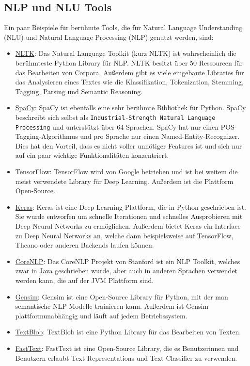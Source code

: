 \subsection{NLP und NLU Tools}\label{subsec:NLP-NLU-Tools}

Ein paar Beispiele für berühmte Tools, die für Natural Language Understanding (NLU) und Natural Language Processing (NLP) genutzt werden, sind:

\begin{itemize}
    \item \href{https://www.nltk.org/}{NLTK}: Das Natural Language Toolkit (kurz NLTK) ist wahrscheinlich die berühmteste Python Library für NLP. NLTK besitzt über 50 Ressourcen für das Bearbeiten von Corpora.
    Außerdem gibt es viele eingebaute Libraries für das Analysieren eines Textes wie die Klassifikation, Tokenization, Stemming, Tagging, Parsing und Semantic Reasoning.
    \item \href{https://spacy.io/}{SpaCy}: SpaCy ist ebenfalls eine sehr berühmte Bibliothek für Python.
    SpaCy beschreibt sich selbst als \texttt{Industrial-Strength Natural Language Processing} und unterstützt über 64 Sprachen.
    SpaCy hat nur einen POS-Tagging-Algorithmus und pro Sprache nur einen Named-Entity-Recognizer.
    Dies hat den Vorteil, dass es nicht voller unnötiger Features ist und sich nur auf ein paar wichtige Funktionalitäten konzentriert.
    \item \href{https://www.tensorflow.org/}{TensorFlow}: TensorFlow wird von Google betrieben und ist bei weitem die meist verwendete Library für Deep Learning.
    Außerdem ist die Plattform Open-Source.
    \item \href{https://keras.io/}{Keras}: Keras ist eine Deep Learning Plattform, die in Python geschrieben ist.
    Sie wurde entworfen um schnelle Iterationen und schnelles Ausprobieren mit Deep Neural Networks zu ermöglichen.
    Außerdem bietet Keras ein Interface zu Deep Neural Networks an, welche dann beispielsweise auf TensorFlow, Theano oder anderen Backends laufen können.
    \item \href{https://stanfordnlp.github.io/CoreNLP/}{CoreNLP}: Das CoreNLP Projekt von Stanford ist ein NLP Toolkit, welches zwar in Java geschrieben wurde, aber auch in anderen Sprachen verwendet werden kann, die auf der JVM Plattform sind.
    \item \href{https://radimrehurek.com/gensim/}{Gensim}: Gensim ist eine Open-Source Library für Python, mit der man semantische NLP Modelle trainieren kann.
    Außerdem ist Gensim plattformunabhängig und läuft auf jedem Betriebssystem.
    \item \href{https://textblob.readthedocs.io/en/dev/}{TextBlob}: TextBlob ist eine Python Library für das Bearbeiten von Texten.
    \item \href{https://fasttext.cc/}{FastText}: FastText ist eine Open-Source Library, die es Benutzerinnen und Benutzern erlaubt Text Representations und Text Classifier zu verwenden.
\end{itemize}


